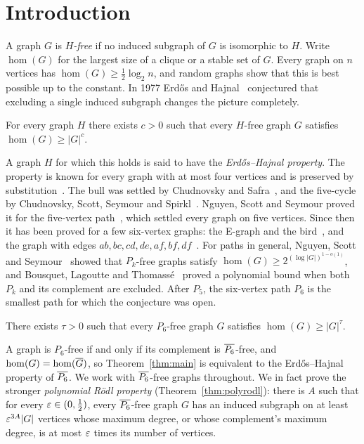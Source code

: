 \section*{Introduction}

A graph $G$ is \emph{$H$-free} if no induced subgraph of $G$ is isomorphic to $H$. Write $\hom(G)$ for
the largest size of a clique or a stable set of $G$. Every graph on $n$ vertices has $\hom(G)\ge
\frac12\log_2 n$, and random graphs show that this is best possible up to the constant. In 1977 Erd\H{o}s
and Hajnal~\cite{EH77,EH} conjectured that excluding a single induced subgraph changes the picture completely.

\begin{conjecture}
For every graph $H$ there exists $c>0$ such that every $H$-free graph $G$ satisfies $\hom(G)\ge|G|^{c}$.
\end{conjecture}

A graph $H$ for which this holds is said to have the \emph{Erd\H{o}s--Hajnal property}. The property is
known for every graph with at most four vertices and is preserved by substitution~\cite{APS}. The bull
was settled by Chudnovsky and Safra~\cite{CS}, and the five-cycle by Chudnovsky, Scott, Seymour and
Spirkl~\cite{C5}. Nguyen, Scott and Seymour proved it for the five-vertex path~\cite{NSS7}, which settled
every graph on five vertices. Since then it has been proved for a few six-vertex graphs: the E-graph and
the bird~\cite{HJZ}, and the graph with edges $ab,bc,cd,de,af,bf,df$~\cite{TN}. For paths in general,
Nguyen, Scott and Seymour~\cite{NSS5} showed that $P_k$-free graphs satisfy $\hom(G)\ge
2^{(\log|G|)^{1-o(1)}}$, and Bousquet, Lagoutte and Thomass\'e~\cite{BLT} proved a polynomial bound when
both $P_k$ and its complement are excluded. After $P_5$, the six-vertex path $P_6$ is the smallest path
for which the conjecture was open.

\begin{theoremL}\label{thm:main}
There exists $\tau>0$ such that every $P_6$-free graph $G$ satisfies $\hom(G)\ge|G|^{\tau}$.
\end{theoremL}

A graph is $P_6$-free if and only if its complement is $\overline{P_6}$-free, and $\hom(G)=\hom(\overline{G})$, so
Theorem~\ref{thm:main} is equivalent to the Erd\H{o}s--Hajnal property of $\overline{P_6}$. We work with
$\overline{P_6}$-free graphs throughout. We in fact prove the stronger \emph{polynomial R\"odl property}
(Theorem~\ref{thm:polyrodl}): there is $A$ such that for every $\varepsilon\in(0,\frac12)$, every $\overline{P_6}$-free
graph $G$ has an induced subgraph on at least $\varepsilon^{3A}|G|$ vertices whose maximum degree, or whose
complement's maximum degree, is at most $\varepsilon$ times its number of vertices.

